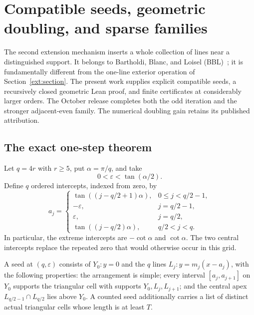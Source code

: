 \section{Compatible seeds, geometric doubling, and sparse families}
\label{fam:section}

The second extension mechanism inserts a whole collection of lines near
a distinguished support.  It belongs to Bartholdi, Blanc, and Loisel
(BBL)~\cite{bbl2008}; it is fundamentally different from the one-line
exterior operation of Section~\ref{ext:section}.  The present work supplies
explicit compatible seeds, a recursively closed geometric Lean proof, and
finite certificates at considerably larger orders. The October release
completes both the odd iteration and the stronger adjacent-even family.
The numerical doubling gain retains its published attribution.

\subsection{The exact one-step theorem}

Let $q=4r$ with $r\geq5$, put $\alpha=\pi/q$, and take
\begin{equation}
  0<\varepsilon<\tan(\alpha/2).
  \label{fam:epsilon}
\end{equation}
Define $q$ ordered intercepts, indexed from zero, by
\begin{equation}
 a_j=
 \begin{cases}
 \tan((j-q/2+1)\alpha),&0\leq j<q/2-1,\\
 -\varepsilon,&j=q/2-1,\\
 \varepsilon,&j=q/2,\\
 \tan((j-q/2)\alpha),&q/2<j<q.
 \end{cases}
 \label{fam:old-grid}
\end{equation}
In particular, the extreme intercepts are $-\cot\alpha$ and
$\cot\alpha$.  The two central intercepts replace the repeated zero that
would otherwise occur in this grid.

\begin{definition}
\label{fam:compatible}
A seed at $(q,\varepsilon)$ consists of $Y_0:y=0$ and the $q$ lines
$L_j:y=m_j(x-a_j)$, with the following properties: the arrangement is
simple; every interval $[a_j,a_{j+1}]$ on $Y_0$ supports the triangular
cell with supports $Y_0,L_j,L_{j+1}$; and the central apex
$L_{q/2-1}\cap L_{q/2}$ lies above $Y_0$.  A counted seed additionally
carries a list of distinct actual triangular cells whose length is at
least $T$.
\end{definition}

